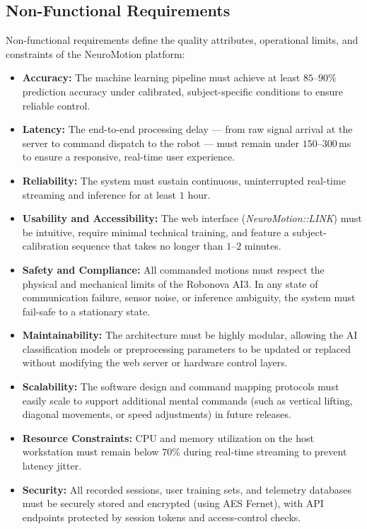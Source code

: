 \documentclass[12pt, a4paper, oneside]{report}
\begin{document}
\subsection{Non-Functional Requirements}

Non-functional requirements define the quality attributes, operational limits, and constraints of the NeuroMotion platform:

\begin{itemize}
    \item \textbf{Accuracy:} The machine learning pipeline must achieve at least $85$--$90\%$ prediction accuracy under calibrated, subject-specific conditions to ensure reliable control.
    \item \textbf{Latency:} The end-to-end processing delay --- from raw signal arrival at the server to command dispatch to the robot --- must remain under $150$--$300$\,ms to ensure a responsive, real-time user experience.
    \item \textbf{Reliability:} The system must sustain continuous, uninterrupted real-time streaming and inference for at least $1$ hour.
    \item \textbf{Usability and Accessibility:} The web interface (\textit{NeuroMotion::LINK}) must be intuitive, require minimal technical training, and feature a subject-calibration sequence that takes no longer than $1$--$2$ minutes.
    \item \textbf{Safety and Compliance:} All commanded motions must respect the physical and mechanical limits of the Robonova AI3. In any state of communication failure, sensor noise, or inference ambiguity, the system must fail-safe to a stationary state.
    \item \textbf{Maintainability:} The architecture must be highly modular, allowing the AI classification models or preprocessing parameters to be updated or replaced without modifying the web server or hardware control layers.
    \item \textbf{Scalability:} The software design and command mapping protocols must easily scale to support additional mental commands (such as vertical lifting, diagonal movements, or speed adjustments) in future releases.
    \item \textbf{Resource Constraints:} CPU and memory utilization on the host workstation must remain below $70\%$ during real-time streaming to prevent latency jitter.
    \item \textbf{Security:} All recorded sessions, user training sets, and telemetry databases must be securely stored and encrypted (using AES Fernet), with API endpoints protected by session tokens and access-control checks.
\end{itemize}
\end{document}
